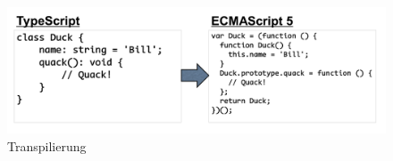 \begin{figure}[ht]
 \centering
 \includegraphics[width=0.8\linewidth]{kapitel2/Introduction-transpiler.png}
 \caption{Transpilierung \cite[27]{ng-Book-2}}
 \label{transpile}
\end{figure}
